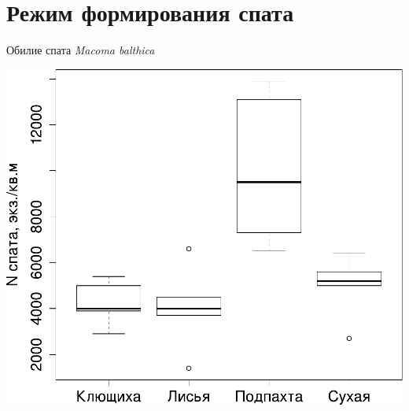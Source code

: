 \documentclass{beamer}
\begin{document}


		\section[Оседание]{Режим формирования спата}
\begin{frame}{Обилие спата \textit{Macoma balthica}}
		\begin{center}
			\includegraphics[width=\textwidth]{N_spat1.pdf}
		\end{center}
\end{frame}
\end{document}

